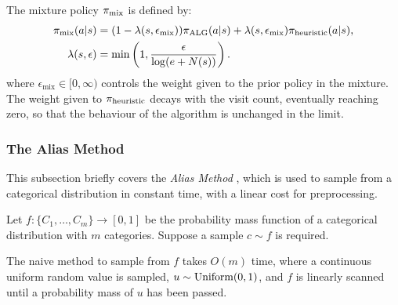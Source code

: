     The mixture policy ${\pi_{\text{mix}}}$ is defined by:
    \begin{align}
        \pi_{\text{mix}}(a|s) &= 
            (1-\lambda(s,\epsilon_{\text{mix}})) {\pi_{{\textnormal{ALG}}}}(a|s) 
            + \lambda(s,\epsilon_{\text{mix}}) {\pi_{\textnormal{heuristic}}}(a|s),\\
        \lambda(s,\epsilon) &= \min\left(1, \frac{\epsilon}{\log(e+N(s))}\right).
    \end{align}
    where $\epsilon_{\text{mix}}\in[0,\infty)$ controls the weight given to the prior policy in the mixture. The weight given to ${\pi_{\textnormal{heuristic}}}$ decays with the visit count, eventually reaching zero, so that the behaviour of the algorithm is unchanged in the limit.






\subsubsection{The Alias Method}
\label{sec:4-2-3-2-alias}

    This subsection briefly covers the \textit{Alias Method} \cite{alias_method_one,alias_method_two}, which is used to sample from a categorical distribution in constant time, with a linear cost for preprocessing.
    
    Let $f:\{C_1,\ldots,C_m\}\rightarrow[0,1]$ be the probability mass function of a categorical distribution with $m$ categories. Suppose a sample $c\sim f$ is required. 
    
    The naive method to sample from $f$ takes $O(m)$ time, where a continuous uniform random value is sampled, $u\sim\textnormal{Uniform}(0,1)$, and $f$ is linearly scanned until a probability mass of $u$ has been passed. %




